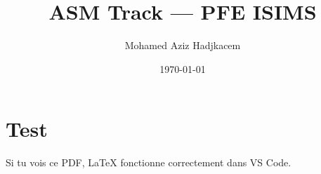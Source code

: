 \documentclass{article}
\begin{document}
\title{ASM Track --- PFE ISIMS}
\author{Mohamed Aziz Hadjkacem}
\date{\today}
\maketitle

\section{Test}
Si tu vois ce PDF, LaTeX fonctionne correctement dans VS Code.
\end{document}
